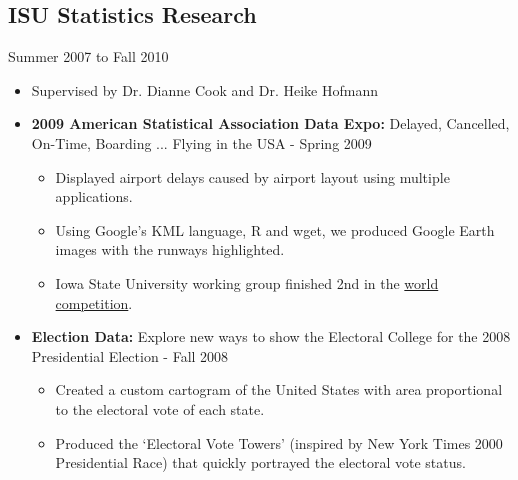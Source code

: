 \documentclass[oneside]{article}
\begin{document}
\subsection{ISU Statistics Research} Summer 2007 to Fall 2010
\begin{itemize}
  \item Supervised by Dr. Dianne Cook and Dr. Heike Hofmann
\end{itemize}

\begin{itemize}
  \item{\bf 2009 American Statistical Association Data Expo:} Delayed, Cancelled, On-Time, Boarding ... Flying in the USA - Spring 2009
    \begin{itemize}
      \item Displayed airport delays caused by airport layout using multiple applications.
      \item Using Google's KML language, R and wget, we produced Google Earth images with the runways highlighted.
      \item Iowa State University working group finished 2nd in the \href{http://stat-computing.org/dataexpo/2009/posters/}{world competition}.
    \end{itemize}



  \item{\bf Election Data:} Explore new ways to show the Electoral College for the 2008 Presidential Election - Fall 2008
  \begin{itemize}
    \item Created a custom cartogram of the United States with area proportional to the electoral vote of each state.
    \item Produced the `Electoral Vote Towers' (inspired by New York Times 2000 Presidential Race) that quickly portrayed the electoral vote status.
  \end{itemize}


\end{itemize}
\end{document}
